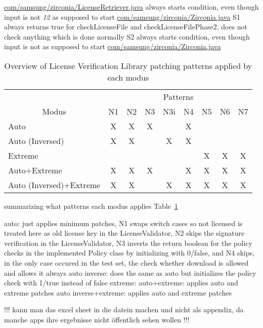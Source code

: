\url{com/samsung/zirconia/LicenseRetriever.java}
always starts condition, even though input is not \textit{12} as supposed to start
\url{com/samsung/zirconia/Zirconia.java}
S1
always returns true for checkLicenseFile and checkLicenseFilePhase2, does not check anything which is done normally
S2
always starts condition, even though input is not as supposed to start
\url{com/samsung/zirconia/Zirconia.java}
\begin{table}[h]
\centering
\begin{tabular}{l|cccccccc}
                           & \multicolumn{8}{c}{Patterns}           \\
\multicolumn{1}{c|}{Modus} & N1 & N2 & N3 & N3i & N4 & N5 & N6 & N7 \\ \hline
Auto                       & X  & X  & X  &     & X  &    &    &    \\
Auto (Inversed)            & X  & X  &    & X   & X  &    &    &    \\
Extreme                    &    &    &    &     &    & X  & X  & X  \\
Auto+Extreme               & X  & X  & X  &     & X  & X  & X  & X  \\
Auto (Inversed)+Extreme    & X  & X  &    & X   & X  & X  & X  & X
\end{tabular}
\caption{Overview of License Verification Library patching patterns applied by each modus}
\label{table:patterns}
\end{table}



summarizing what patterns each modus applies Table~\ref{table:patterns}


auto: just applies minimum patches, N1 swaps switch cases so not licensed is treated here as old license key in the LicenseValidator, N2 skips the signature verification in the LicenseValidator, N3 inverts the return boolean for the policy checks in the implemented Policy class by initializing with 0/false, and N4 skips, in the only case occured in the test set, the check whether download is allowed and allows it always
auto inverse: does the same as auto but initializes the policy check with 1/true instead of false
extreme:
auto+extreme: applies auto and extreme patches
auto inverse+extreme: applies auto and extreme patches




!!! kann man das excel sheet in die datein machen und nicht als appendix, da manche apps ihre ergebnisse nicht öffentlich sehen wollen !!!
